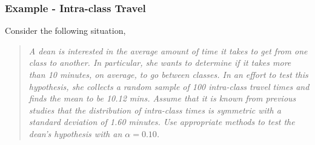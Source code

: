 \documentclass[10pt,openany]{book}\usepackage[]{graphicx}\usepackage[]{color}
\begin{document}
\subsubsection{Example - Intra-class Travel}
Consider the following situation,
\begin{quote}
\textsl{A dean is interested in the average amount of time it takes to get from one class to another.  In particular, she wants to determine if it takes more than 10 minutes, on average, to go between classes.  In an effort to test this hypothesis, she collects a random sample of 100 intra-class travel times and finds the mean to be 10.12 mins.  Assume that it is known from previous studies that the distribution of intra-class times is symmetric with a standard deviation of 1.60 minutes.  Use appropriate methods to test the dean's hypothesis with an $\alpha=0.10$.}
\end{quote}
\end{document}
